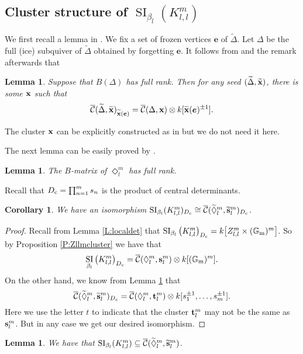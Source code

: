 \documentclass{amsart}
\newtheorem{lemma}[theorem]{Lemma}
\newtheorem{corollary}[theorem]{Corollary}
\theoremstyle{definition}
\theoremstyle{remark}
\numberwithin{equation}{section}
\DeclareMathOperator{\SI}{SI}
\newcommand{\mc}[1]{\mathcal{#1}}
\newcommand{\mb}[1]{\mathbb{#1}}
\renewcommand{\b}[1]{\bold{#1}}
\newcommand{\bs}[1]{\boldsymbol{#1}}
\newcommand{\br}[1]{\overline{#1}}
\newcommand{\wtd}[1]{\widetilde{#1}}
\newcommand{\uca}{\br{\mc{C}}}
\newcommand{\kllm}{{K_{l,l}^m}}
\newcommand{\zllm}{{Z_{l,l}^m}}
\newcommand{\bl}{{\beta_l}}
\begin{document}
\subsection{Cluster structure of $\SI_\bl(\kllm)$}
We first recall a lemma in \cite{FW}.
We fix a set of frozen vertices $\bs{e}$ of $\wtd{\Delta}$.
Let $\Delta$ be the full (ice) subquiver of $\wtd{\Delta}$ obtained by forgetting $\bs{e}$.
It follows from \cite[Lemma 2.2]{FW} and the remark afterwards that

\begin{lemma} \label{L:frext=}  Suppose that $B(\Delta)$ has full rank.
Then for any seed $(\wtd{\Delta},\wtd{\b{x}})$, there is some $\b{x}$ such that
	$$\uca(\wtd{\Delta},\wtd{\b{x}})_{\wtd{\b{x}}(\bs{e})}=\uca(\Delta,\b{x})\otimes k[\wtd{\b{x}}(\bs{e})^{\pm 1}].$$
\end{lemma}
\noindent The cluster $\b{x}$ can be explicitly constructed as in \cite{FW} but we do not need it here.


The next lemma can be easily proved by \cite[Lemma 3.3 and 3.4]{FW}.
\begin{lemma} \label{L:fullrank} The $B$-matrix of $\Diamond_l^m$ has full rank.	
\end{lemma}



Recall that $D_{\rm c}=\prod_{n=1}^m {s}_n$ is the product of central determinants. 
\begin{corollary} \label{C:SIcluster} We have an isomorphism 
	$\SI_\bl(\kllm)_{D_{\rm c}}\cong \uca(\wtd{\Diamond}_l^m,\wtd{\b{s}}_l^m)_{D_{\rm c}}$.
\end{corollary}

\begin{proof} Recall from Lemma \ref{L:localdet} that 
	$\SI_\bl\big(\kllm\big)_{D_{\rm c}} = k\big[\zllm\times (\mb{G}_{\rm m})^m\big]$. 
	So by Proposition \ref{P:Zllmcluster} we have that
$$\SI_\bl\big(\kllm\big)_{D_c} =\uca(\Diamond_l^m,\b{s}_l^m) \otimes k[(\mb{G}_{\rm m})^m].$$
	On the other hand, we know from Lemma \ref{L:frext=} that 
$$\uca(\wtd{\Diamond}_l^m,\wtd{\b{s}}_l^m)_{D_c}=\uca({\Diamond}_l^m,{\b{t}}_l^m)\otimes k[{s}_1^{\pm 1},\dots,{s}_m^{\pm 1}].$$
Here we use the letter $t$ to indicate that the cluster $\b{t}_l^m$ may not be the same as $\b{s}_l^m$. 
But in any case we get our desired isomorphism.
\end{proof}

\begin{lemma} \label{L:ACR} We have that $\SI_\bl(\kllm)\subseteq \uca(\wtd{\Diamond}_l^m,\wtd{\b{s}}_l^m)$.
\end{lemma}
\end{document}
